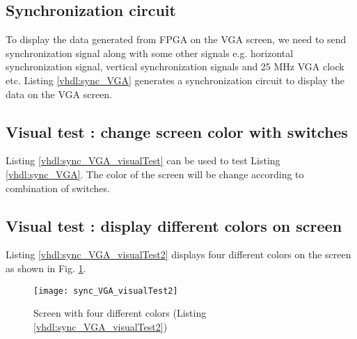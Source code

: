 \subsection{Synchronization circuit}
To display the data generated from FPGA on the VGA screen, we need to send synchronization signal along with some other signals e.g. horizontal synchronization signal, vertical synchronization signals and 25 MHz VGA clock etc. Listing \ref{vhdl:sync_VGA} generates a synchronization circuit to display the data on the VGA screen.   


\subsection{Visual test : change screen color with switches}
Listing \ref{vhdl:sync_VGA_visualTest} can be used to test Listing \ref{vhdl:sync_VGA}. The color of the screen will be change according to combination of switches. 



\subsection{Visual test : display different colors on screen}
Listing \ref{vhdl:sync_VGA_visualTest2} displays four different colors on the screen as shown in Fig. \ref{fig:sync_VGA_visualTest2}. 

\begin{figure}[!h]
	\centering
	\texttt{[image: sync\_VGA\_visualTest2]}
	\caption{Screen with four different colors (Listing \ref{vhdl:sync_VGA_visualTest2})}
	\label{fig:sync_VGA_visualTest2}
\end{figure}


